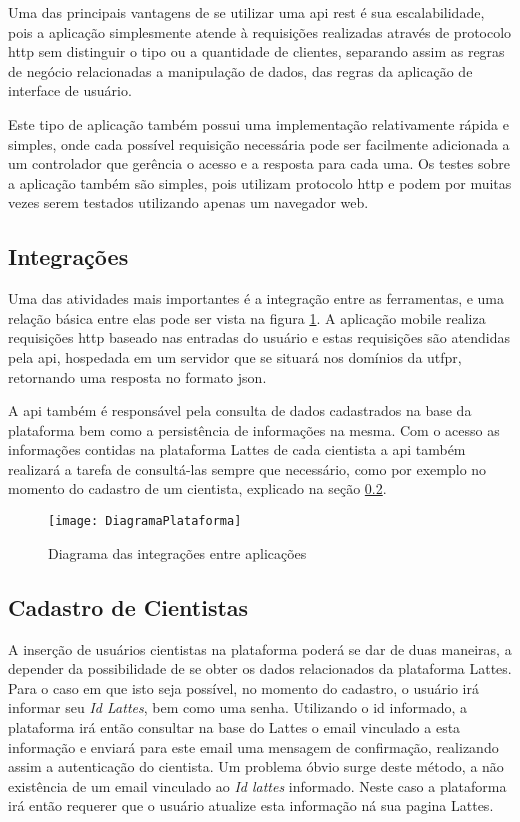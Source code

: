 Uma das principais vantagens de se utilizar uma \gls{api} \gls{rest} é sua escalabilidade, pois a aplicação simplesmente atende à requisições realizadas através de protocolo \gls{http} sem distinguir o tipo ou a quantidade de clientes, separando assim as regras de negócio relacionadas a manipulação de dados, das regras da aplicação de interface de usuário.

Este tipo de aplicação também possui uma implementação relativamente rápida e simples, onde cada possível requisição necessária pode ser facilmente adicionada a um controlador que gerência o acesso e a resposta para cada uma. Os testes sobre a aplicação também são simples, pois utilizam protocolo \gls{http} e podem por muitas vezes serem testados utilizando apenas um navegador web.

\subsection{Integrações}\label{subsec:integrar}

Uma das atividades mais importantes é a integração entre as ferramentas, e uma relação básica entre elas pode ser vista na figura \ref{fig:diagrama}. A aplicação mobile realiza requisições \gls{http} baseado nas entradas do usuário e estas requisições são atendidas pela \gls{api}, hospedada em um servidor que se situará nos domínios da \gls{utfpr}, retornando uma resposta no formato \gls{json}.

A \gls{api} também é responsável pela consulta de dados cadastrados na base da plataforma bem como a persistência de informações na mesma. Com o acesso as informações contidas na plataforma Lattes de cada cientista a \gls{api} também realizará a tarefa de consultá-las sempre que necessário, como por exemplo no momento do cadastro de um cientista, explicado na seção \ref{subsec:cadastro}.

\begin{figure}[htb]
    \caption{Diagrama das integrações entre aplicações}
    \texttt{[image: DiagramaPlataforma]}
    \label{fig:diagrama}
\end{figure}

\subsection{Cadastro de Cientistas}\label{subsec:cadastro}

A inserção de usuários cientistas na plataforma poderá se dar de duas maneiras, a depender da possibilidade de se obter os dados relacionados da plataforma Lattes. Para o caso em que isto seja possível, no momento do cadastro, o usuário irá informar seu \textit{Id Lattes}, bem como uma senha. Utilizando o id informado, a plataforma irá então consultar na base do Lattes o email vinculado a esta informação e enviará para este email uma mensagem de confirmação, realizando assim a autenticação do cientista. Um problema óbvio surge deste método, a não existência de um email vinculado ao \textit{Id lattes} informado. Neste caso a plataforma irá então requerer que o usuário atualize esta informação ná sua pagina Lattes.

